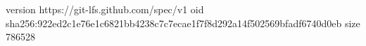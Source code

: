 version https://git-lfs.github.com/spec/v1
oid sha256:922ed2c1e76e1c6821bb4238c7c7ecae1f7f8d292a14f502569bfadf6740d0eb
size 786528
